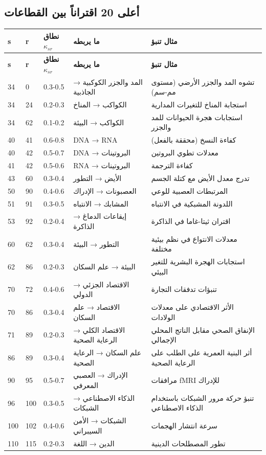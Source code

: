 \documentclass[13pt,a4paper]{article}
\begin{document}
	\subsection*{أعلى 20 اقتراناً بين القطاعات}
	
	\begin{longtable}{|p{1cm}|p{1cm}|p{2.5cm}|p{4cm}|p{3cm}|}
		\hline
		\textbf{s} & \textbf{r} & \textbf{نطاق $\kappa_{sr}$} & \textbf{ما يربطه} & \textbf{مثال تنبؤ} \\
		\hline
		\endfirsthead
		\hline
		\textbf{s} & \textbf{r} & \textbf{نطاق $\kappa_{sr}$} & \textbf{ما يربطه} & \textbf{مثال تنبؤ} \\
		\hline
		\endhead
		
		34 & 0 & 0.3-0.5 & المد والجزر الكوكبية → الجاذبية & تشوه المد والجزر الأرضي (مستوى مم-سم) \\
		34 & 24 & 0.2-0.3 & الكواكب → المناخ & استجابة المناخ للتغيرات المدارية \\
		34 & 62 & 0.1-0.2 & الكواكب → البيئة & استجابات هجرة الحيوانات للمد والجزر \\
		40 & 41 & 0.6-0.8 & DNA → RNA & كفاءة النسخ (محققة بالفعل) \\
		40 & 42 & 0.5-0.7 & DNA → البروتينات & معدلات تطوي البروتين \\
		41 & 42 & 0.5-0.6 & RNA → البروتينات & كفاءة الترجمة \\
		43 & 60 & 0.3-0.4 & الأيض → التطور & تدرج معدل الأيض مع كتلة الجسم \\
		50 & 90 & 0.4-0.6 & العصبونات → الإدراك & المرتبطات العصبية للوعي \\
		51 & 91 & 0.3-0.5 & المشابك → الانتباه & اللدونة المشبكية في الانتباه \\
		53 & 92 & 0.2-0.4 & إيقاعات الدماغ → الذاكرة & اقتران ثيتا-غاما في الذاكرة \\
		60 & 62 & 0.3-0.4 & التطور → البيئة & معدلات الانتواع في نظم بيئية مختلفة \\
		62 & 86 & 0.2-0.3 & البيئة → علم السكان & استجابات الهجرة البشرية للتغير البيئي \\
		70 & 72 & 0.4-0.6 & الاقتصاد الجزئي → الدولي & تنبؤات تدفقات التجارة \\
		70 & 86 & 0.3-0.4 & الاقتصاد → علم السكان & الأثر الاقتصادي على معدلات الولادات \\
		71 & 89 & 0.2-0.3 & الاقتصاد الكلي → الرعاية الصحية & الإنفاق الصحي مقابل الناتج المحلي الإجمالي \\
		86 & 89 & 0.3-0.4 & علم السكان → الرعاية الصحية & أثر البنية العمرية على الطلب على الرعاية الصحية \\
		90 & 95 & 0.5-0.7 & الإدراك → العصبي المعرفي & مرافقات fMRI للإدراك \\
		96 & 100 & 0.3-0.5 & الذكاء الاصطناعي → الشبكات & تنبؤ حركة مرور الشبكات باستخدام الذكاء الاصطناعي \\
		100 & 102 & 0.4-0.6 & الشبكات → الأمن السيبراني & سرعة انتشار الهجمات \\
		110 & 115 & 0.2-0.3 & الدين → اللغة & تطور المصطلحات الدينية \\
		\hline
	\end{longtable}
	
\end{document}
